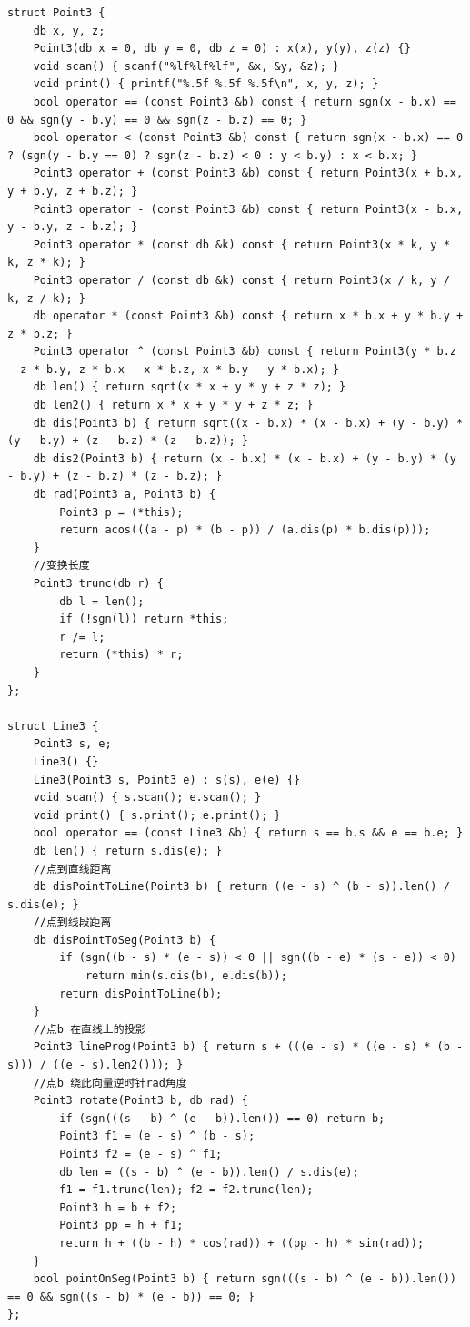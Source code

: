 \begin{lstlisting}
struct Point3 {
	db x, y, z;
	Point3(db x = 0, db y = 0, db z = 0) : x(x), y(y), z(z) {}
	void scan() { scanf("%lf%lf%lf", &x, &y, &z); }
	void print() { printf("%.5f %.5f %.5f\n", x, y, z); }
	bool operator == (const Point3 &b) const { return sgn(x - b.x) == 0 && sgn(y - b.y) == 0 && sgn(z - b.z) == 0; }
	bool operator < (const Point3 &b) const { return sgn(x - b.x) == 0 ? (sgn(y - b.y == 0) ? sgn(z - b.z) < 0 : y < b.y) : x < b.x; }
	Point3 operator + (const Point3 &b) const { return Point3(x + b.x, y + b.y, z + b.z); }
	Point3 operator - (const Point3 &b) const { return Point3(x - b.x, y - b.y, z - b.z); }
	Point3 operator * (const db &k) const { return Point3(x * k, y * k, z * k); }
	Point3 operator / (const db &k) const { return Point3(x / k, y / k, z / k); }
	db operator * (const Point3 &b) const { return x * b.x + y * b.y + z * b.z; }
	Point3 operator ^ (const Point3 &b) const { return Point3(y * b.z - z * b.y, z * b.x - x * b.z, x * b.y - y * b.x); }
	db len() { return sqrt(x * x + y * y + z * z); }
	db len2() { return x * x + y * y + z * z; }
	db dis(Point3 b) { return sqrt((x - b.x) * (x - b.x) + (y - b.y) * (y - b.y) + (z - b.z) * (z - b.z)); }
	db dis2(Point3 b) { return (x - b.x) * (x - b.x) + (y - b.y) * (y - b.y) + (z - b.z) * (z - b.z); }
	db rad(Point3 a, Point3 b) {
		Point3 p = (*this);
		return acos(((a - p) * (b - p)) / (a.dis(p) * b.dis(p)));
	}
	//变换长度
	Point3 trunc(db r) {
		db l = len();
		if (!sgn(l)) return *this;
		r /= l;
		return (*this) * r;
	}
};

struct Line3 {
	Point3 s, e;
	Line3() {}
	Line3(Point3 s, Point3 e) : s(s), e(e) {}
	void scan() { s.scan(); e.scan(); }
	void print() { s.print(); e.print(); }
	bool operator == (const Line3 &b) { return s == b.s && e == b.e; }
	db len() { return s.dis(e); }
	//点到直线距离
	db disPointToLine(Point3 b) { return ((e - s) ^ (b - s)).len() / s.dis(e); }
	//点到线段距离
	db disPointToSeg(Point3 b) {
		if (sgn((b - s) * (e - s)) < 0 || sgn((b - e) * (s - e)) < 0)
			return min(s.dis(b), e.dis(b));
		return disPointToLine(b);
	}
	//点b 在直线上的投影
	Point3 lineProg(Point3 b) { return s + (((e - s) * ((e - s) * (b - s))) / ((e - s).len2())); }
	//点b 绕此向量逆时针rad角度
	Point3 rotate(Point3 b, db rad) {
		if (sgn(((s - b) ^ (e - b)).len()) == 0) return b;
		Point3 f1 = (e - s) ^ (b - s);
		Point3 f2 = (e - s) ^ f1;
		db len = ((s - b) ^ (e - b)).len() / s.dis(e);
		f1 = f1.trunc(len); f2 = f2.trunc(len);
		Point3 h = b + f2;
		Point3 pp = h + f1;
		return h + ((b - h) * cos(rad)) + ((pp - h) * sin(rad));
	}
	bool pointOnSeg(Point3 b) { return sgn(((s - b) ^ (e - b)).len()) == 0 && sgn((s - b) * (e - b)) == 0; }
};


\end{lstlisting}
